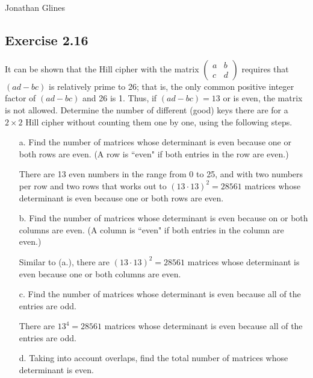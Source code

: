 \documentclass[12pt]{article}
\begin{document}
\begin{flushright}
\Large{Jonathan Glines}
\end{flushright}
\subsection*{Exercise 2.16}
It can be shown that the Hill cipher with the matrix $\left(\begin{matrix} a & b \\ c & d\end{matrix}\right)$ requires that $\left(ad - bc\right)$ is relatively prime to 26; that is, the only common positive integer factor of $\left(ad - bc\right)$ and 26 is 1. Thus, if $\left(ad - bc\right) = 13$ or is even, the matrix is not allowed. Determine the number of different (good) keys there are for a $2 \times 2$ Hill cipher without counting them one by one, using the following steps.
\begin{itemize}
\item[a.] Find the number of matrices whose determinant is even because one or both rows are even. (A row is ``even" if both entries in the row are even.)

There are 13 even numbers in the range from 0 to 25, and with two numbers per row and two rows that works out to $\left(13 \cdot 13\right)^2 = 28561$ matrices whose determinant is even because one or both rows are even.

\item[b.] Find the number of matrices whose determinant is even because on or both columns are even. (A column is ``even" if both entries in the column are even.)

Similar to (a.), there are $\left(13 \cdot 13\right)^2 = 28561$ matrices whose determinant is even because one or both columns are even.

\item[c.] Find the number of matrices whose determinant is even because all of the entries are odd.

There are $13^4 = 28561$ matrices whose determinant is even because all of the entries are odd.

\item[d.] Taking into account overlaps, find the total number of matrices whose determinant is even.



\end{itemize}
\end{document}
